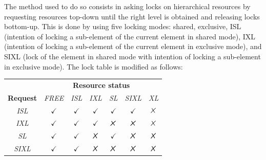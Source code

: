 \begin{itemize}
        The method used to do so consists in asking locks on hierarchical resources by requesting resources top-down until the right level is obtained and releasing locks bottom-up. 
        This is done by using five locking modes: shared, exclusive, ISL (intention of locking a sub-element of the current element in shared mode), IXL (intention of locking a sub-element of the current element in exclusive mode), and SIXL (lock of the element in shared mode with intention of locking a sub-element in exclusive mode). 
        The lock table is modified as follows:
    \begin{table}[H]
        \centering
        \begin{tabular}{ccccccc}
        \textbf{}                             & \multicolumn{6}{c}{\textbf{Resource status}}                                                                                                                                                                            \\ \cline{2-7} 
        \multicolumn{1}{c|}{\textbf{Request}} & \multicolumn{1}{c|}{\textit{FREE}} & \multicolumn{1}{c|}{\textit{ISL}} & \multicolumn{1}{c|}{\textit{IXL}} & \multicolumn{1}{c|}{\textit{SL}}  & \multicolumn{1}{c|}{\textit{SIXL}} & \multicolumn{1}{c|}{\textit{XL}}  \\ \hline
        \multicolumn{1}{|c|}{\textit{ISL}}    & \multicolumn{1}{c|}{$\checkmark$}  & \multicolumn{1}{c|}{$\checkmark$} & \multicolumn{1}{c|}{$\checkmark$} & \multicolumn{1}{c|}{$\checkmark$} & \multicolumn{1}{c|}{$\checkmark$}  & \multicolumn{1}{c|}{$\tikzxmark$} \\ \hline
        \multicolumn{1}{|c|}{\textit{IXL}}    & \multicolumn{1}{c|}{$\checkmark$}  & \multicolumn{1}{c|}{$\checkmark$} & \multicolumn{1}{c|}{$\checkmark$} & \multicolumn{1}{c|}{$\tikzxmark$} & \multicolumn{1}{c|}{$\tikzxmark$}  & \multicolumn{1}{c|}{$\tikzxmark$} \\ \hline
        \multicolumn{1}{|c|}{\textit{SL}}     & \multicolumn{1}{c|}{$\checkmark$}  & \multicolumn{1}{c|}{$\checkmark$} & \multicolumn{1}{c|}{$\tikzxmark$} & \multicolumn{1}{c|}{$\checkmark$} & \multicolumn{1}{c|}{$\tikzxmark$}  & \multicolumn{1}{c|}{$\tikzxmark$} \\ \hline
        \multicolumn{1}{|c|}{\textit{SIXL}}   & \multicolumn{1}{c|}{$\checkmark$}  & \multicolumn{1}{c|}{$\checkmark$} & \multicolumn{1}{c|}{$\tikzxmark$} & \multicolumn{1}{c|}{$\tikzxmark$} & \multicolumn{1}{c|}{$\tikzxmark$}  & \multicolumn{1}{c|}{$\tikzxmark$} \\ \hline

\end{tabular}
\end{table}
\end{itemize}
